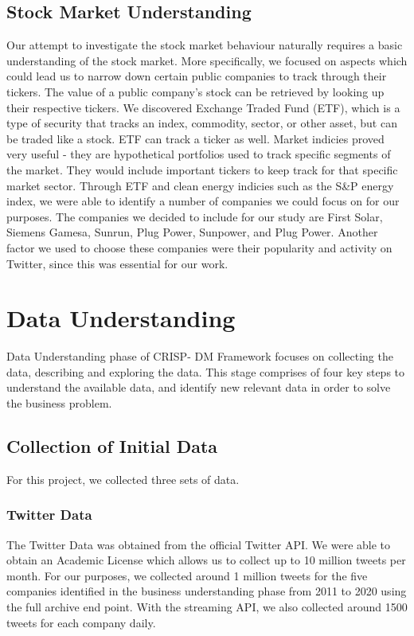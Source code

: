 \documentclass[sigconf, nonacm]{acmart}
\begin{document}
\subsection{Stock Market Understanding}
Our attempt to investigate the stock market behaviour naturally requires a basic understanding of the stock market. More specifically, we focused on aspects which could lead us to narrow down certain public companies to track through their tickers. The value of a public company's stock can be retrieved by looking up their respective tickers. We discovered Exchange Traded Fund (ETF), which is a type of security that tracks an index, commodity, sector, or other asset, but can be traded like a stock. ETF can track a ticker as well. Market indicies proved very useful - they are hypothetical portfolios used to track specific segments of the market. They would include important tickers to keep track for that specific market sector. Through ETF and clean energy indicies such as the S\&P energy index, we were able to identify a number of companies we could focus on for our purposes.  The companies we decided to include for our study are First Solar, Siemens Gamesa, Sunrun, Plug Power, Sunpower, and Plug Power. Another factor we used to choose these companies were their popularity and activity on Twitter, since this was essential for our work. 


\section{Data Understanding}
Data Understanding phase of CRISP- DM Framework focuses on collecting the data, describing and exploring the data. This stage comprises of four key steps to understand the available data, and identify new relevant data in order to solve the business problem. 

\subsection{Collection of Initial Data} %
For this project, we collected three sets of data.

\subsubsection{Twitter Data}
The Twitter Data was obtained from the official Twitter API. We were able to obtain an Academic License which allows us to collect up to 10 million tweets per month. For our purposes, we collected around 1 million tweets for the five companies identified in the business understanding phase from 2011 to 2020 using the full archive end point. With the streaming API, we also collected around 1500 tweets for each company daily.
\end{document}
